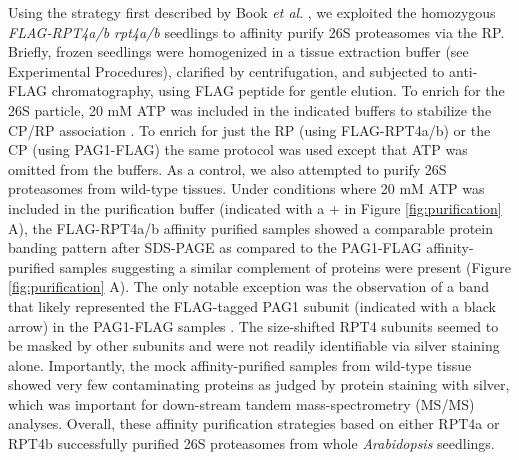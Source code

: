 	Using the strategy first described by Book \textit{et al}. \citep{book10}, we exploited the homozygous \textit{FLAG-RPT4a/b rpt4a/b} seedlings to affinity purify 26S proteasomes via the RP. Briefly, frozen seedlings were homogenized in a tissue extraction buffer (see Experimental Procedures), clarified by centrifugation, and subjected to anti-FLAG chromatography, using FLAG peptide for gentle elution.  To enrich for the 26S particle, 20 mM ATP was included in the indicated buffers to stabilize the CP/RP association \citep{book10, liu06}. To enrich for just the RP (using FLAG-RPT4a/b) or the CP (using PAG1-FLAG) the same protocol was used except that ATP was omitted from the buffers. As a control, we also attempted to purify 26S proteasomes from wild-type tissues.  Under conditions where 20 mM ATP was included in the purification buffer (indicated with a + in Figure \ref{fig:purification} A), the FLAG-RPT4a/b affinity purified samples showed a comparable protein banding pattern after SDS-PAGE as compared to the PAG1-FLAG affinity-purified samples suggesting a similar complement of proteins were present (Figure  \ref{fig:purification} A). The only notable exception was the observation of a band that likely represented the FLAG-tagged PAG1 subunit (indicated with a black arrow) in the PAG1-FLAG samples \citep{book10}. The size-shifted RPT4 subunits seemed to be masked by other subunits and were not readily identifiable via silver staining alone. Importantly, the mock affinity-purified samples from wild-type tissue showed very few contaminating proteins as judged by protein staining with silver, which was important for down-stream tandem mass-spectrometry (MS/MS) analyses. Overall, these affinity purification strategies based on either RPT4a or RPT4b successfully purified 26S proteasomes from whole \textit{Arabidopsis} seedlings.
